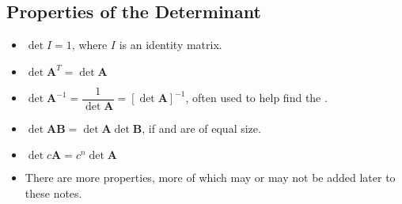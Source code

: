 \begin{itemize}
  \subsection{Properties of the Determinant}\label{Properties of the Determinant}
  \begin{itemize}
    \item \(\det{I}=1\), where \(I\) is an identity matrix.
    \item \(\det{\bm{A}^T} = \det{\bm{A}}\) 
    \item \(\det{\bm{A}^{-1}} = \dfrac{1}{\det{\bm{A}}}= [\det{\bm{A}}]^{-1} \), often used to help find the \hyperref[Matrix Inverse]{}. %
    \item \(\det{\bm{AB}}=\det{\bm{A}}\det{\bm{B}} \), if  and  are of equal size.
    \item \(\det{c \bm{A}} = c^n \det{\bm{A}}\)
    \item There are more properties, more of which may or may not be added later to these notes.
  \end{itemize}
  
\end{itemize}

